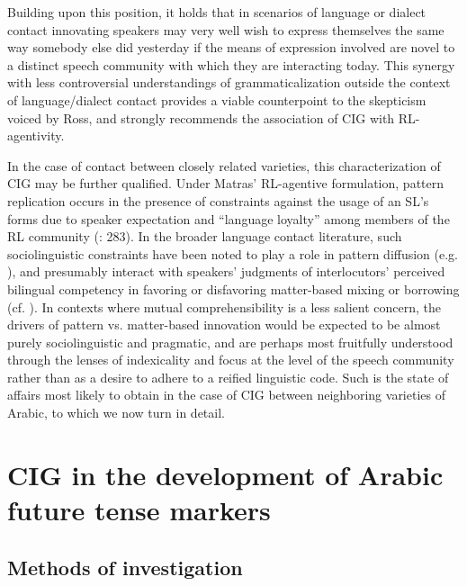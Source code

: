 \documentclass[output=paper]{langsci/langscibook}
\begin{document}
Building upon this position, it holds that in scenarios of language or dialect contact innovating speakers may very well wish to express themselves the same way somebody else did yesterday if the means of expression involved are novel to a distinct speech community with which they are interacting today. This synergy with less controversial understandings of grammaticalization outside the context of language/dialect contact provides a viable counterpoint to the skepticism voiced by Ross, and strongly recommends the association of CIG with RL-agentivity.

In the case of contact between closely related varieties, this characterization of CIG may be further qualified. Under Matras’ RL-agentive formulation, pattern replication occurs in the presence of constraints against the usage of an SL’s forms due to speaker expectation and “language loyalty” among members of the RL community (\citeyear{Matras2011gram}: 283).  In the broader language contact literature, such sociolinguistic constraints have been noted to play a role in pattern diffusion (e.g. \citealt{Epps2005}), and presumably interact with speakers’ judgments of interlocutors’ perceived bilingual competency in favoring or disfavoring matter-based mixing or borrowing (cf. \citealt{Grosjean2001}). In contexts where mutual comprehensibility is a less salient concern, the drivers of pattern vs. matter-based innovation would be expected to be almost purely sociolinguistic and pragmatic, and are perhaps most fruitfully understood through the lenses of indexicality \citep{Silverstein2003} and focus at the level of the speech community \citep{LePageTabouret-Keller1985} rather than as a desire to adhere to a reified linguistic code. Such is the state of affairs most likely to obtain in the case of CIG between neighboring varieties of Arabic, to which we now turn in detail.

\section{ CIG in the development of Arabic future tense markers}

\subsection{ Methods of investigation}
\end{document}
